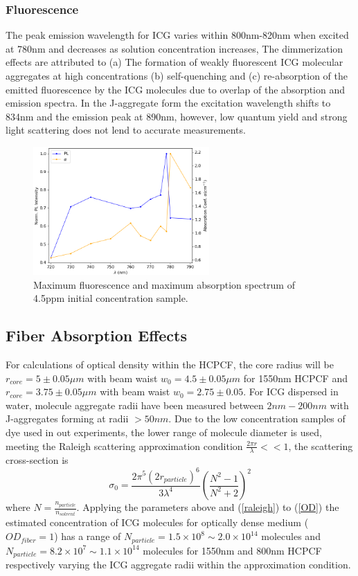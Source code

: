 \subsubsection{ Fluorescence}
The peak emission wavelength for ICG varies within 800nm-820nm\cite{philip, saxena} when excited at 780nm and decreases as solution concentration increases, The dimmerization effects are attributed to (a) The formation of weakly fluorescent ICG molecular aggregates at high concentrations (b) self-quenching and (c) re-absorption of the emitted fluorescence by the ICG molecules due to overlap of the absorption and emission spectra. In the J-aggregate form  the excitation wavelength shifts to 834nm and the emission peak at 890nm, however, low quantum yield and strong light scattering does not lend to accurate measurements\cite{rotermund}.  
\begin{figure}[!htb]
	\centering
	\includegraphics[width=0.6\textwidth]{./Figures/ICG/wl_fluor_absp.png}
	\caption{ Maximum fluorescence and maximum absorption spectrum of 4.5ppm initial concentration sample.}
	\label{fig:i}
\end{figure}
\clearpage
\subsection{Fiber Absorption Effects}
For calculations of optical density within the HCPCF, the core radius will be  $r_{core} = 5\pm 0.05\mu m$ with beam waist $w_0 = 4.5 \pm 0.05\mu m$ for 1550nm HCPCF and $r_{core} = 3.75 \pm0.05\mu m$ with beam waist $w_0 = 2.75 \pm 0.05$. For ICG dispersed in water, molecule aggregate radii have been measured between $2nm - 200nm$ \cite{dedora} with J-aggregates forming at radii $>50nm$\cite{weigand}. Due to the low concentration samples of dye used in out experiments, the lower range of molecule diameter is used, meeting the Raleigh scattering approximation condition $\frac{2\pi r}{\lambda} <<1$, the scattering cross-section is 
\begin{equation}
	\sigma_0 = \frac{2\pi^5 (2r_{particle})^6}{3\lambda^4}(\frac{N^2 -1}{N^2+2})^2
	\label{raleigh}
\end{equation}
where $N=\frac{n_{particle}}{n_{solvent}}$. Applying the parameters above and  (\ref{raleigh}) to (\ref{OD}) the estimated concentration of ICG molecules for optically dense medium ($OD_{fiber}=1$) has a range of $N_{particle} = 1.5\times 10^8 \sim 2.0\times 10^{14}$ molecules and $N_{particle} = 8.2\times 10^7 \sim 1.1\times 10^{14}$ molecules for 1550nm and 800nm HCPCF respectively varying the ICG aggregate radii within the approximation condition. \\

